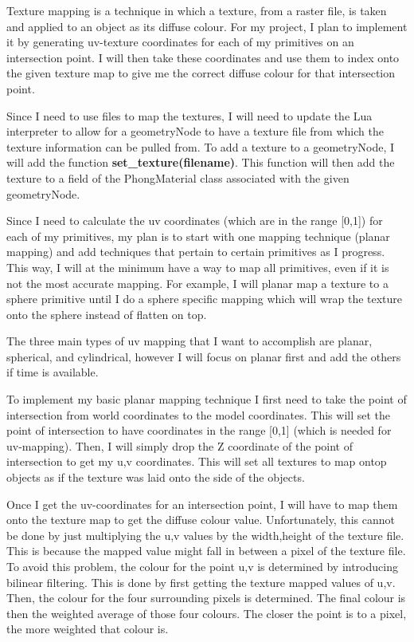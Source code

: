 \documentclass {article}
\begin{document}
\begin{description}
\begin{itemize}
	 Texture mapping is a technique in which a texture, from a raster file, is taken and applied to an object as its diffuse colour. For my project, I plan to implement it by generating uv-texture coordinates for each of my primitives on an intersection point. I will then take these coordinates and use them to index onto the given texture map to give me the correct diffuse colour for that intersection point. \newline
	
	 Since I need to use files to map the textures, I will need to update the Lua interpreter to allow for a geometryNode to have a texture file from which the texture information can be pulled from. To add a texture to a geometryNode, I will add the function {\bf set\_texture(filename)}. This function will then add the texture to a field of the PhongMaterial class associated with the given geometryNode. \newline
	
	 Since I need to calculate the uv coordinates (which are in the range [0,1]) for each of my primitives, my plan is to start with one mapping technique (planar mapping) and add techniques that pertain to certain primitives as I progress. This way, I will at the minimum have a way to map all primitives, even if it is not the most accurate mapping. For example, I will planar map a texture to a sphere primitive until I do a sphere specific mapping which will wrap the texture onto the sphere instead of flatten on top. \newline
	
	 The three main types of uv mapping that I want to accomplish are planar, spherical, and cylindrical, however I will focus on planar first and add the others if time is available. \newline
	
	 To implement my basic planar mapping technique I first need to take the point of intersection from world coordinates to the model coordinates. This will set the point of intersection to have coordinates in the range [0,1] (which is needed for uv-mapping). Then, I will simply drop the Z coordinate of the point of intersection to get my u,v coordinates. This will set all textures to map ontop objects as if the texture was laid onto the side of the objects. \newline
	
	 Once I get the uv-coordinates for an intersection point, I will have to map them onto the texture map to get the diffuse colour value. Unfortunately, this cannot be done by just multiplying the u,v values by the width,height of the texture file. This is because the mapped value might fall in between a pixel of the texture file. To avoid this problem, the colour for the point u,v is determined by introducing bilinear filtering. This is done by first getting the texture mapped values of u,v. Then, the colour for the four surrounding pixels is determined. The final colour is then the weighted average of those four colours. The closer the point is to a pixel, the more weighted that colour is. \newline
	 

\end{itemize}
\end{description}
\end{document}
